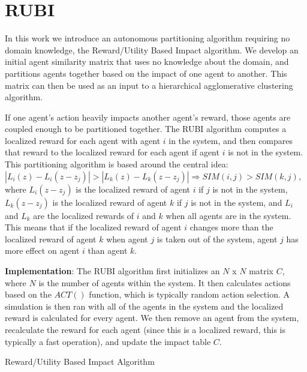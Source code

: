 \documentclass{aamas_extabstract}
\begin{document}

\section{RUBI}

In this work we introduce an autonomous partitioning algorithm requiring no domain knowledge, the Reward/Utility Based Impact algorithm. We develop an initial agent similarity matrix that uses no knowledge about the domain, and partitions agents together based on the impact of one agent to another. This matrix can then be used as an input to a hierarchical agglomerative clustering algorithm. 

If one agent's action heavily impacts another agent's reward, those agents are coupled enough to be partitioned together. The RUBI algorithm computes a localized reward for each agent with agent $i$ in the system, and then compares that reward to the localized reward for each agent if agent $i$ is not in the system. This partitioning algorithm is based around the central idea: $|L_i(z) - L_i(z-z_j)| > |L_k(z) - L_k(z-z_j)| \Rightarrow SIM(i,j) > SIM(k,j)$, where $L_i(z-z_j)$ is the localized reward of agent $i$ if $j$ is not in the system, $L_k(z-z_j)$ is the localized reward of agent $k$ if $j$ is not in the system, and $L_i$ and $L_k$ are the localized rewards of $i$ and $k$ when all agents are in the system. This means that if the localized reward of agent $i$ changes more than the localized reward of agent $k$ when agent $j$ is taken out of the system, agent $j$ has more effect on agent $i$ than agent $k$. 

\textbf{Implementation}: The RUBI algorithm first initializes an $N$ x $N$ matrix $C$, where $N$ is the number of agents within the system. It then calculates actions based on the $ACT()$ function, which is typically random action selection. A simulation is then ran with all of the agents in the system and the localized reward is calculated for every agent. We then remove an agent from the system, recalculate the reward for each agent (since this is a localized reward, this is typically a fast operation), and update the impact table $C$. 
%
\begin{algorithm} [t]\label{alg:RUBI}
  \caption{Reward/Utility Based Impact Algorithm}
  \begin{algorithmic}[1]
    \Statex
				\EndFor
		\EndFor
	\EndFor        
    \EndFunction
  \end{algorithmic}
\end{algorithm}
%
\end{document}
